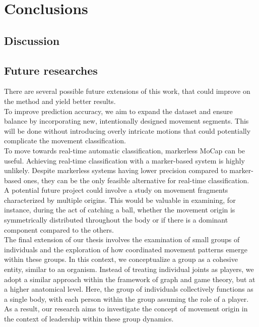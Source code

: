 \chapter{Conclusions}

\section{Discussion}


\section{Future researches}
There are several possible future extensions of this work, that could improve on the method
and yield better results.\\

To improve prediction accuracy, we aim to expand the dataset and ensure balance by incorporating new, intentionally designed movement segments.
This will be done without introducing overly intricate motions that could potentially complicate the movement classification.
\\
To move towards real-time automatic classification, markerless MoCap can be useful.
Achieving real-time classification with a marker-based system is highly unlikely.
Despite markerless systems having lower precision compared to marker-based ones, they can be the only feasible alternative for real-time classification.
\\
A potential future project could involve a study on movement fragments characterized by multiple origins.
This would be valuable in examining, for instance, during the act of catching a ball, whether the movement origin is symmetrically distributed throughout the body or if there is a dominant component compared to the others.
\\
The final extension of our thesis involves the examination of small groups of individuals and the exploration of how coordinated movement patterns emerge within these groups.
In this context, we conceptualize a group as a cohesive entity, similar to an organism.
Instead of treating individual joints as players, we adopt a similar approach within the framework of graph and game theory, but at a higher anatomical level.
Here, the group of individuals collectively functions as a single body, with each person within the group assuming the role of a player.
As a result, our research aims to investigate the concept of movement origin in the context of leadership within these group dynamics.